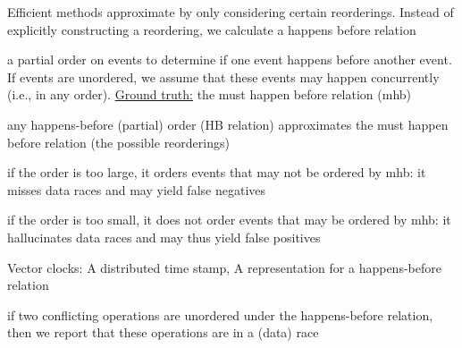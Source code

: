 \documentclass[landscape, a4paper]{article}
\begin{document}
\begin{minipage}[t]{0.2\linewidth}
\begin{betterlist}
		\begin{betterlist}
			\item Efficient methods approximate by only considering certain reorderings. Instead of explicitly constructing a reordering, we calculate a happens before relation%
			\item \alert{a partial order} on events to determine if one event happens before another event. If events are unordered, we assume that these events may happen concurrently (i.e., in any order). \uline{Ground truth:} the \alert{must happen before relation (mhb)}
			\item any \alert{happens-before (partial) order} (HB relation) approximates the must happen before relation (the possible reorderings)
			\begin{betterlist}
				\item if the order is \alert{too large}, it orders events that may not be ordered by mhb: it misses data races and may yield false negatives
				\item if the order is \alert{too small}, it does not order events that may be ordered by mhb: it hallucinates data races and may thus yield false positives
			\end{betterlist}
			\item \alert{Vector clocks}: A distributed time stamp, A representation for a happens-before relation
			\item if two conflicting operations are unordered under the happens-before relation, then we report that these operations are in a (data) race
		\end{betterlist}
	\end{betterlist}
\end{minipage}
\end{document}
